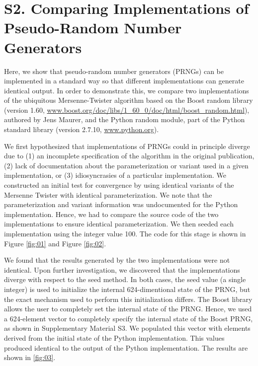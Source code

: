 \documentclass{article}
\begin{document}
\section*{S2. Comparing Implementations of Pseudo-Random Number Generators}

Here, we show that pseudo-random number generators (PRNGs) can be implemented in a standard way so that different implementations can generate identical output. In order to demonstrate this, we compare two implementations of the ubiquitous Mersenne-Twister algorithm \cite{matsumoto1998mersenne} based on the Boost random library (version 1.60, \href{www.boost.org/doc/libs/1\_60\_0/doc/html/boost\_random.html}{www.boost.org/doc/libs/1\_60\_0/doc/html/boost\_random.html}), authored by Jens Maurer, and the Python random module, part of the Python standard library (version 2.7.10, \href{www.python.org}{www.python.org}).

We first hypothesized that implementations of PRNGs could in principle diverge due to (1) an incomplete specification of the algorithm in the original publication, (2) lack of documentation about the parameterization or variant used in a given implementation, or (3) idiosyncrasies of a particular implementation. We constructed an initial test for convergence by using identical variants of the Mersenne Twister with identical parameterization. We note that the parameterization and variant information was undocumented for the Python implementation. Hence, we had to compare the source code of the two implementations to ensure identical parameterization. We then seeded each implementation using the integer value 100. The code for this stage is shown in Figure \ref{fig:01} and Figure \ref{fig:02}.

We found that the results generated by the two implementations were not identical. Upon further investigation, we discovered that the implementations diverge with respect to the seed method. In both cases, the seed value (a single integer) is used to initialize the internal 624-dimentional state of the PRNG, but the exact mechanism used to perform this initialization differs. The Boost library allows the user to completely set the internal state of the PRNG. Hence, we used a 624-element vector to completely specify the internal state of the Boost PRNG, as shown in Supplementary Material S3. We populated this vector with elements derived from the initial state of the Python implementation. This values produced identical to the output of the Python implementation. The results are shown in \ref{fig:03}.
\end{document}
